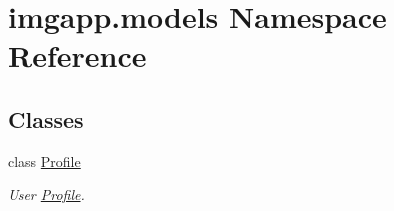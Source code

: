 \hypertarget{namespaceimgapp_1_1models}{}\section{imgapp.\+models Namespace Reference}
\label{namespaceimgapp_1_1models}
\subsection*{Classes}
\begin{DoxyCompactItemize}
\item 
class \hyperlink{classimgapp_1_1models_1_1Profile}{Profile}
\begin{DoxyCompactList}\small\item\em User \hyperlink{classimgapp_1_1models_1_1Profile}{Profile}. \end{DoxyCompactList}\end{DoxyCompactItemize}
